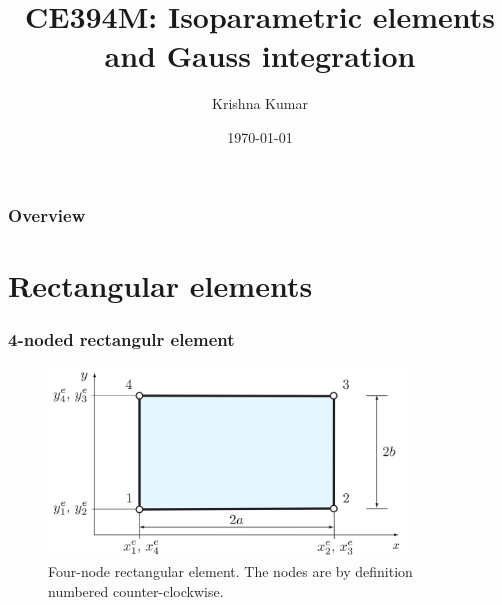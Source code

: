 \documentclass[notes]{beamer}
\title[CE394M: isoparametric - gauss integration]{CE394M: Isoparametric elements and Gauss integration}
\author{Krishna Kumar} %
\institute[UT Austin] %
{
University of Texas at Austin \\
\medskip
\textit{
  \url{krishnak@utexas.edu}} %
}
\date{\today} %
\begin{document}
\begin{frame}
\titlepage %
\end{frame}

\begin{frame}
 \frametitle{Overview}
 \tableofcontents
\end{frame}

\section{Rectangular elements}
\begin{frame}
\frametitle{4-noded rectangulr element}
\begin{figure}[ht]
	\centering
	\includegraphics[width=0.85\textwidth]{figs/four-noded-quadrilateral.png}
	\caption*{Four-node rectangular element. The nodes are by definition numbered counter-clockwise.}
\end{figure}
\end{frame}
\end{document}

